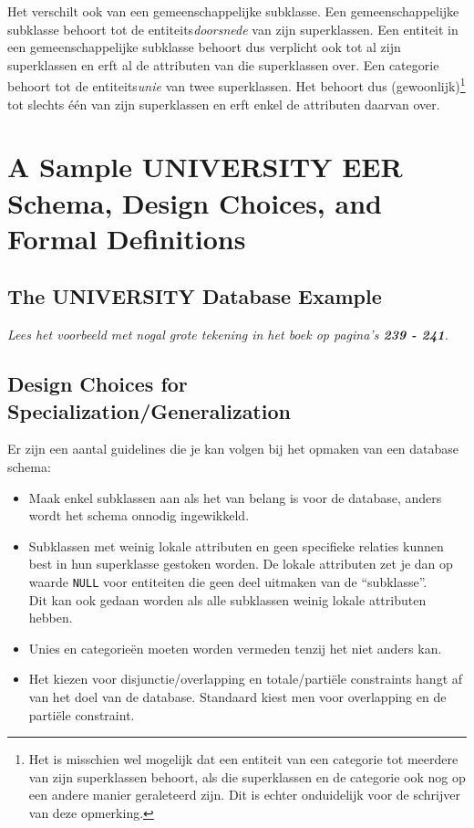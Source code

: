 \noindent Het verschilt ook van een gemeenschappelijke subklasse. Een gemeenschappelijke subklasse behoort tot de entiteits\textit{doorsnede} van zijn superklassen. Een entiteit in een gemeenschappelijke subklasse behoort dus verplicht ook tot al zijn superklassen en erft al de attributen van die superklassen over. Een categorie behoort tot de entiteits\textit{unie} van twee superklassen. Het behoort dus (gewoonlijk)\footnote{Het is misschien wel mogelijk dat een entiteit van een categorie tot meerdere van zijn superklassen behoort, als die superklassen en de categorie ook nog op een andere manier geraleteerd zijn. Dit is echter onduidelijk voor de schrijver van deze opmerking.} tot slechts \'e\'en van zijn superklassen en erft enkel de attributen daarvan over.


\section{A Sample UNIVERSITY EER Schema, Design Choices, and Formal Definitions}
\subsection{The UNIVERSITY Database Example}
\textit{Lees het voorbeeld met nogal grote tekening in het boek op pagina's \textbf{239 - 241}.}

\subsection{Design Choices for Specialization/Generalization}
Er zijn een aantal guidelines die je kan volgen bij het opmaken van een database schema:
\begin{itemize}
\item Maak enkel subklassen aan als het van belang is voor de database, anders wordt het schema onnodig ingewikkeld.
\item Subklassen met weinig lokale attributen en geen specifieke relaties kunnen best in hun superklasse gestoken worden. De lokale attributen zet je dan op waarde \texttt{NULL} voor entiteiten die geen deel uitmaken van de ``subklasse''.\\
Dit kan ook gedaan worden als alle subklassen weinig lokale attributen hebben.
\item Unies en categorie\"en moeten worden vermeden tenzij het niet anders kan.
\item Het kiezen voor disjunctie/overlapping en totale/parti\"ele constraints hangt af van het doel van de database. Standaard kiest men voor overlapping en de parti\"ele constraint.
\end{itemize}

